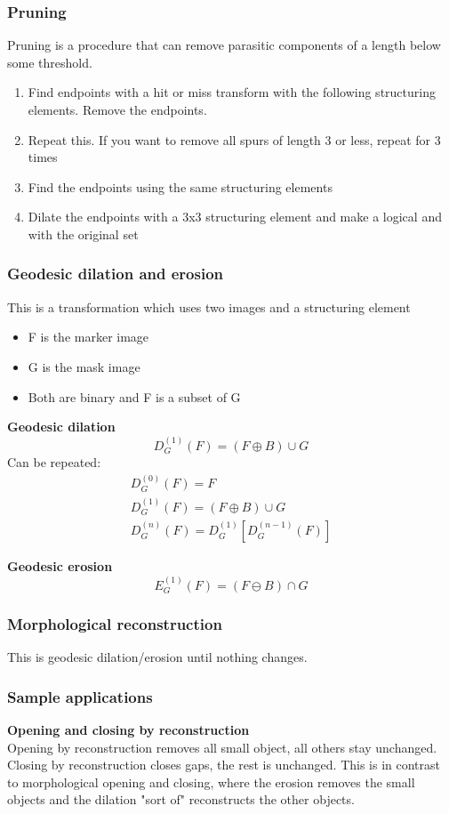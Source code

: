 \subsubsection{Pruning}
Pruning is a procedure that can remove parasitic components of a length below some threshold.\\
\begin{enumerate}
\item Find endpoints with a hit or miss transform with the following structuring elements. Remove the endpoints.
\item Repeat this. If you want to remove all spurs of length 3 or less, repeat for 3 times
\item Find the endpoints using the same structuring elements
\item Dilate the endpoints with a 3x3 structuring element and make a logical and with the original set
\end{enumerate}

\subsubsection{Geodesic dilation and erosion}
This is a transformation which uses two images and a structuring element
\begin{itemize}
\item F is the marker image
\item G is the mask image
\item Both are binary and F is a subset of G
\end{itemize}
\textbf{Geodesic dilation}
\[
	D_G^{(1)}(F) = (F\oplus B)\cup G
\]
Can be repeated:
\begin{align*}
	D_G^{(0)}(F) = F \\
	D_G^{(1)}(F) = (F\oplus B)\cup G\\
	D_G^{(n)}(F) = D_G^{(1)}[D_G^{(n-1)}(F)]
\end{align*}

\textbf{Geodesic erosion}
\[
	E_G^{(1)}(F) = (F\ominus B)\cap G
\]

\subsubsection{Morphological reconstruction}
This is geodesic dilation/erosion until nothing changes.

\subsubsection{Sample applications}
\textbf{Opening and closing by reconstruction}\\
Opening by reconstruction removes all small object, all others stay unchanged.
Closing by reconstruction closes gaps, the rest is unchanged. This is in contrast to morphological opening and closing, where the erosion removes the small objects and the dilation "sort of" reconstructs the other objects.\\

